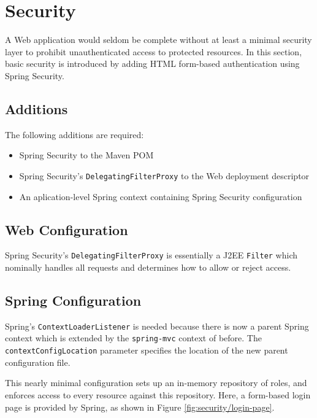 \documentclass{article}
\begin{document}
\pagebreak
\section{Security}

A Web application would seldom be complete without at least a minimal security layer to prohibit unauthenticated access to protected resources.  In this section, basic security is introduced by adding HTML form-based authentication using Spring Security.

\subsection{Additions}

The following additions are required:

\begin{itemize}
\item Spring Security to the Maven POM
\item Spring Security's \texttt{DelegatingFilterProxy} to the Web deployment descriptor
\item An aplication-level Spring context containing Spring Security configuration
\end{itemize}

\subsection{Web Configuration}

Spring Security's \texttt{DelegatingFilterProxy} is essentially a J2EE \texttt{Filter} which nominally handles all requests and determines how to allow or reject access.



\subsection{Spring Configuration}

Spring's \texttt{ContextLoaderListener} is needed because there is now a parent Spring context which is extended by the \texttt{spring-mvc} context of before.  The \texttt{contextConfigLocation} parameter specifies the location of the new parent configuration file.



This nearly minimal configuration sets up an in-memory repository of roles, and enforces access to every resource against this repository.  Here, a form-based login page is provided by Spring, as shown in Figure \ref{fig:security/login-page}.
\end{document}
